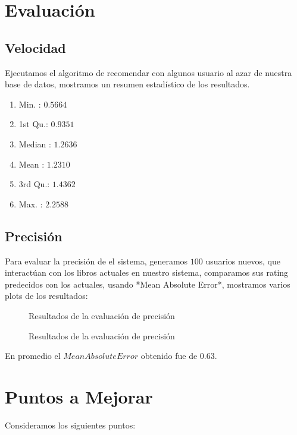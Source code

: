 \documentclass[14pt]{extarticle}
\begin{document}
\section{Evaluación}
\subsection{Velocidad}

Ejecutamos el algoritmo de recomendar con algunos usuario al azar de nuestra base de datos, mostramos un resumen estadístico de los resultados. 
\begin{enumerate}
    \item Min.   : $0.5664$
    \item 1st Qu.: $0.9351$
    \item  Median : $1.2636  $
    \item Mean   : $1.2310  $
    \item 3rd Qu.: $1.4362 $
    \item Max.   : $2.2588$ 
\end{enumerate}

\subsection{Precisión}

Para evaluar la precisión de el sistema, generamos $100$ usuarios nuevos, que interactúan con los libros actuales en nuestro sistema, comparamos sus rating predecidos con los actuales, usando *Mean Absolute Error*, mostramos varios plots de los resultados:

\begin{figure}[h]
    \centering
    
    \caption{Resultados de la evaluación de precisión}
    \label{fig:precision-plot}
\end{figure}

\begin{figure}[h]
    \centering
    
    \caption{Resultados de la evaluación de precisión}
    \label{fig:precision-plot}
\end{figure}

En promedio el $Mean Absolute Error$ obtenido fue de $0.63$. 

\section{Puntos a Mejorar}

Consideramos los siguientes puntos:
\end{document}
